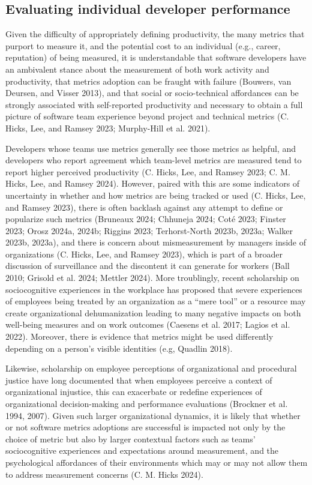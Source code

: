 \documentclass[
]{article}
\begin{document}
\subsection{Evaluating individual developer
performance}\label{evaluating-individual-developer-performance}

Given the difficulty of appropriately defining productivity, the many
metrics that purport to measure it, and the potential cost to an
individual (e.g., career, reputation) of being measured, it is
understandable that software developers have an ambivalent stance about
the measurement of both work activity and productivity, that metrics
adoption can be fraught with failure (Bouwers, van Deursen, and Visser
2013), and that social or socio-technical affordances can be strongly
associated with self-reported productivity and necessary to obtain a
full picture of software team experience beyond project and technical
metrics (C. Hicks, Lee, and Ramsey 2023; Murphy-Hill et al. 2021).

Developers whose teams use metrics generally see those metrics as
helpful, and developers who report agreement which team-level metrics
are measured tend to report higher perceived productivity (C. Hicks,
Lee, and Ramsey 2023; C. M. Hicks, Lee, and Ramsey 2024). However,
paired with this are some indicators of uncertainty in whether and how
metrics are being tracked or used (C. Hicks, Lee, and Ramsey 2023),
there is often backlash against any attempt to define or popularize such
metrics (Bruneaux 2024; Chhuneja 2024; Coté 2023; Finster 2023; Orosz
2024a, 2024b; Riggins 2023; Terhorst-North 2023b, 2023a; Walker 2023b,
2023a), and there is concern about mismeasurement by managers inside of
organizations (C. Hicks, Lee, and Ramsey 2023), which is part of a
broader discussion of surveillance and the discontent it can generate
for workers (Ball 2010; Grisold et al. 2024; Mettler 2024). More
troublingly, recent scholarship on sociocognitive experiences in the
workplace has proposed that severe experiences of employees being
treated by an organization as a ``mere tool'' or a resource may create
organizational dehumanization leading to many negative impacts on both
well-being measures and on work outcomes (Caesens et al. 2017; Lagios et
al. 2022). Moreover, there is evidence that metrics might be used
differently depending on a person's visible identities (e.g, Quadlin
2018).

Likewise, scholarship on employee perceptions of organizational and
procedural justice have long documented that when employees perceive a
context of organizational injustice, this can exacerbate or redefine
experiences of organizational decision-making and performance
evaluations (Brockner et al. 1994, 2007). Given such larger
organizational dynamics, it is likely that whether or not software
metrics adoptions are successful is impacted not only by the choice of
metric but also by larger contextual factors such as teams'
sociocognitive experiences and expectations around measurement, and the
psychological affordances of their environments which may or may not
allow them to address measurement concerns (C. M. Hicks 2024).
\end{document}
